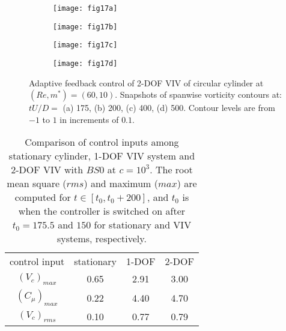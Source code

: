 \documentclass[standard]{jfm}
\begin{document}
\begin{figure}
\centering
  \begin{subfigure}[c]{0.47\textwidth}
\centering
  \texttt{[image: fig17a]} 
    \caption{}
    \label{fig:viv2dof_175}
    \end{subfigure}  
    \begin{subfigure}[c]{0.47\textwidth}
\centering
  \texttt{[image: fig17b]} 
    \caption{}
    \label{fig:viv2dof_200}
    \end{subfigure}    
\begin{subfigure}[b]{0.47\textwidth} 
\centering
  \texttt{[image: fig17c]}
	\caption{}
	\label{fig:viv2dof_300}
	\end{subfigure}	
\begin{subfigure}[b]{0.47\textwidth} 
\centering
  \texttt{[image: fig17d]} 
	\caption{}
	\label{fig:viv2dof_400}
	\end{subfigure}				
\caption{Adaptive feedback control of 2-DOF VIV of circular cylinder at $(Re, m^*)=(60,10)$. Snapshots of spanwise vorticity contours at: 
        $tU/D=$ (a) 175, (b) 200, (c) 400, (d) 500. 
        Contour levels are from $-1$ to $1$ in increments of $0.1$.}
\label{fig:viv2dof_vor} 
\end{figure}

\begin{table}
  \begin{center}
  \begin{tabular}{c c c c }
       control input   & stationary & 1-DOF &  2-DOF \\
       $(V_{c})_{max}$   & 0.65 & 2.91 & 3.00 \\
       $(C_{\mu})_{max}$   & 0.22 & 4.40 & 4.70 \\
      $(V_{c})_{rms}$   & 0.10 & 0.77 & 0.79 

  \end{tabular}
  \caption{ Comparison of control inputs among stationary cylinder, 1-DOF VIV system and 2-DOF VIV
  with $BS0$ at $c=10^3$. The root mean square ($rms$) and maximum ($max$) are computed for $t \in [t_0,t_0+200]$, and $t_0$ is when 
  the controller is switched on after $t_0=175.5$ and $150$ for stationary and VIV systems, respectively.}
  \label{tab:summary}
  \end{center}
\end{table}
 
\end{document}

